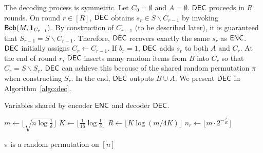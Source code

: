The decoding process is symmetric.  Let $C_0=\emptyset$ and $A=\emptyset$.  $\textsf{DEC}$ proceeds in $R$ rounds.  On round $r\in[R]$, $\textsf{DEC}$ obtains $s_r\in S\backslash C_{r-1}$ by invoking $\mathsf{Bob}(M, \mathbf{1}_{C_{r-1}})$.  By construction of $C_{r-1}$ (to be described later), it is guaranteed that $S_{r-1}=S\backslash C_{r-1}$.  Therefore, $\textsf{DEC}$ recovers exactly the same $s_r$ as $\textsf{ENC}$.  $\textsf{DEC}$ initially assigns $C_r\leftarrow C_{r-1}$.  If $b_r=1$, $\textsf{DEC}$ adds $s_r$ to both $A$ and $C_r$.  At the end of round $r$, $\textsf{DEC}$ inserts many random items from $B$ into $C_r$ so that $C_r=S\backslash S_r$.  $\textsf{DEC}$ can achieve this because of the shared random permutation $\pi$ when constructing $S_r$.  In the end, $\textsf{DEC}$ outputs $B\cup A$.  We present $\textsf{DEC}$ in Algorithm~\ref{algo:dec}.

\begin{algorithm}[H] 
  \caption{Variables shared by encoder $\textsf{ENC}$ and decoder $\textsf{DEC}$.} \label{algo:para}
  \begin{algorithmic}[1] 
    \State $m\leftarrow \lfloor \sqrt{n \log\frac{1}{\delta}} \rfloor$ 
    \State $K\leftarrow \lfloor \frac{1}{16}\log \frac{1}{\delta} \rfloor$
    \State $R\leftarrow \lfloor K\log(m/4K) \rfloor$
      \State $n_r\leftarrow \lfloor m \cdot 2^{-\frac{r}{K}} \rfloor$
      
     \begin{flushright}\end{flushright}
    \EndFor
    \State $\pi$ is a random permutation on $[n]$      
    
    \begin{flushright}\end{flushright}
  \end{algorithmic}
\end{algorithm}

